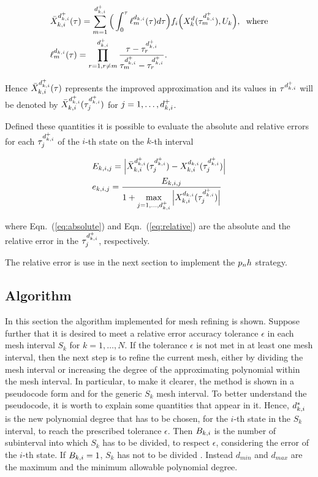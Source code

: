 \begin{subequations}
\begin{align}
	&\bar{X}_{k,i}^{d_{k,i}^{+}} (\tau) = \sum_{m=1}^{d_{k,i}^{+}}\Big(\int_{0}^{\tau}\ell_{m}^{d_{k,i}} (\tau)d\tau\Big) f_i\Big(X_{k}^{d}(\tau^{{d}_{k,i}^{+}}_m), U_k\Big), \hspace{2mm} \text{where} \label{eq:barX}\\
	&  \ell_{m}^{d_{k,i}} (\tau) = \prod_{r=1, r\neq m}^{d_{k,i}^{+}} \dfrac{\tau - \tau^{{d}_{k,i}^{+}}_r}{\tau^{{d}_{k,i}^{+}}_m - \tau^{{d}_{k,i}^{+}}_r}. \label{eq:meshlm}
\end{align}

\end{subequations}

Hence $\bar{X}_{k,i}^{d_{k,i}^{+}} (\tau)$ represents the improved approximation and its values in $\tau^{{d}_{k,i}^{+}}$ will be denoted by $\bar{X}_{k,i}^{d_{k,i}^{+}} (\tau^{{d}_{k,i}^{+}}_j)$ for $j = 1, \dots, d_{k,i}^{+}$.

Defined these quantities it is possible to evaluate the absolute and relative errors for each $\tau^{{d}_{k,i}^{+}}_j$ of the $i$-th state on the $k$-th interval

\begin{subequations}
	\begin{align}
	&E_{k,i,j} = \Big|\bar{X}_{k,i}^{d_{k,i}^{+}} (\tau^{{d}_{k,i}^{+}}_j) - X_{k,i}^{d_{k,i}} (\tau^{{d}_{k,i}^{+}}_j)\Big| \label{eq:absolute}\\
	&e_{k,i,j} = \dfrac{E_{k,i,j}}{1 + \max\limits_{j= 1, \dots, d_{k,i}^{+}} \Big| X_{k,i}^{d_{k,i}} (\tau^{{d}_{k,i}^{+}}_j)\Big|} \label{eq:relative}
	\end{align}
\end{subequations}

where Eqn.~(\ref{eq:absolute}) and Eqn.~(\ref{eq:relative}) are the absolute and the relative error in the $\tau^{{d}_{k,i}^{+}}_j$, respectively.

The relative error is use in the next section to implement the $p_{n}h$ strategy.

\subsection*{Algorithm}
In this section the algorithm implemented for mesh refining is shown.
Suppose further that it is desired to meet a relative error accuracy tolerance $\epsilon$ in each mesh
interval $S_k$ for $k = 1, \dots, N$. If the tolerance  $\epsilon$  is not met in at least one mesh interval, then the next step is to refine the current mesh, either by dividing the mesh interval or increasing the degree of the approximating polynomial within the mesh interval.
In particular, to make it clearer, the method is shown in a pseudocode form and for the generic $S_k$ mesh interval.
To better understand the pseudocode, it is worth to explain some quantities that appear in it.
Hence, $d_{k,i}^{*}$ is the new polynomial degree that has to be chosen, for the $i$-th state in the $S_k$ interval, to reach the prescribed tolerance $\epsilon$. Then $B_{k,i}$ is the number of subinterval into which $S_k$ has to be divided, to respect $\epsilon$, considering the error of the $i$-th state. If $B_{k,i} = 1$, $S_k$ has not to be divided . Instead $d_{min}$ and $d_{max}$ are the maximum and the minimum allowable polynomial degree.

